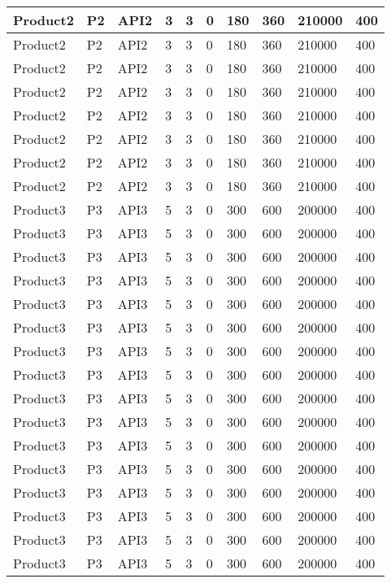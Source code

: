 \documentclass{article}
\begin{document}
\begin{longtable}[l]{|p{1.5cm}|p{1.7cm}|p{1cm}|p{1.5cm}|p{1.7cm}|p{1cm}|p{1cm}|p{1cm}|p{1cm}|p{1.5cm}|}
\hline
Product2 & P2 & API2 & 3 & 3 & 0 & 180 & 360 & 210000 & 400\\
\hline
Product2 & P2 & API2 & 3 & 3 & 0 & 180 & 360 & 210000 & 400\\
\hline
Product2 & P2 & API2 & 3 & 3 & 0 & 180 & 360 & 210000 & 400\\
\hline
Product2 & P2 & API2 & 3 & 3 & 0 & 180 & 360 & 210000 & 400\\
\hline
Product2 & P2 & API2 & 3 & 3 & 0 & 180 & 360 & 210000 & 400\\
\hline
Product2 & P2 & API2 & 3 & 3 & 0 & 180 & 360 & 210000 & 400\\
\hline
Product2 & P2 & API2 & 3 & 3 & 0 & 180 & 360 & 210000 & 400\\
\hline
Product2 & P2 & API2 & 3 & 3 & 0 & 180 & 360 & 210000 & 400\\
\hline
Product3 & P3 & API3 & 5 & 3 & 0 & 300 & 600 & 200000 & 400\\
\hline
Product3 & P3 & API3 & 5 & 3 & 0 & 300 & 600 & 200000 & 400\\
\hline
Product3 & P3 & API3 & 5 & 3 & 0 & 300 & 600 & 200000 & 400\\
\hline
Product3 & P3 & API3 & 5 & 3 & 0 & 300 & 600 & 200000 & 400\\
\hline
Product3 & P3 & API3 & 5 & 3 & 0 & 300 & 600 & 200000 & 400\\
\hline
Product3 & P3 & API3 & 5 & 3 & 0 & 300 & 600 & 200000 & 400\\
\hline
Product3 & P3 & API3 & 5 & 3 & 0 & 300 & 600 & 200000 & 400\\
\hline
Product3 & P3 & API3 & 5 & 3 & 0 & 300 & 600 & 200000 & 400\\
\hline
Product3 & P3 & API3 & 5 & 3 & 0 & 300 & 600 & 200000 & 400\\
\hline
Product3 & P3 & API3 & 5 & 3 & 0 & 300 & 600 & 200000 & 400\\
\hline
Product3 & P3 & API3 & 5 & 3 & 0 & 300 & 600 & 200000 & 400\\
\hline
Product3 & P3 & API3 & 5 & 3 & 0 & 300 & 600 & 200000 & 400\\
\hline
Product3 & P3 & API3 & 5 & 3 & 0 & 300 & 600 & 200000 & 400\\
\hline
Product3 & P3 & API3 & 5 & 3 & 0 & 300 & 600 & 200000 & 400\\
\hline
Product3 & P3 & API3 & 5 & 3 & 0 & 300 & 600 & 200000 & 400\\
\hline
Product3 & P3 & API3 & 5 & 3 & 0 & 300 & 600 & 200000 & 400\\

\end{longtable}
\end{document}
